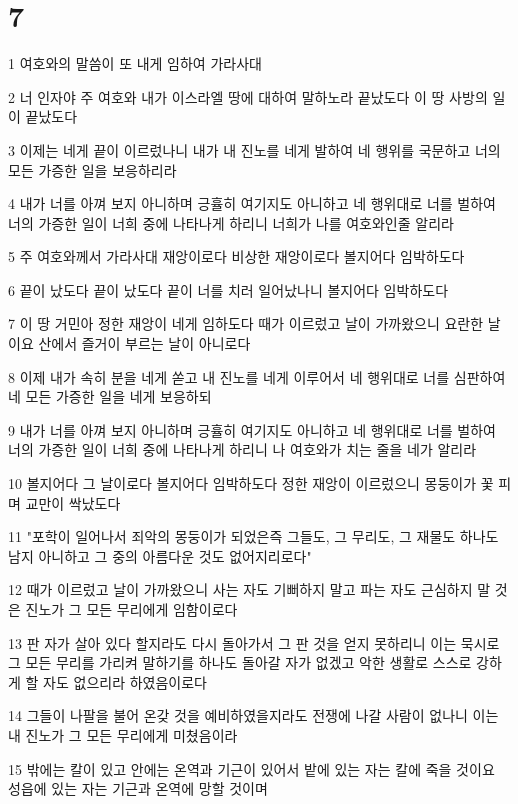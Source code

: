 \chapter{7}

\par 1 여호와의 말씀이 또 내게 임하여 가라사대
\par 2 너 인자야 주 여호와 내가 이스라엘 땅에 대하여 말하노라 끝났도다 이 땅 사방의 일이 끝났도다
\par 3 이제는 네게 끝이 이르렀나니 내가 내 진노를 네게 발하여 네 행위를 국문하고 너의 모든 가증한 일을 보응하리라
\par 4 내가 너를 아껴 보지 아니하며 긍휼히 여기지도 아니하고 네 행위대로 너를 벌하여 너의 가증한 일이 너희 중에 나타나게 하리니 너희가 나를 여호와인줄 알리라
\par 5 주 여호와께서 가라사대 재앙이로다 비상한 재앙이로다 볼지어다 임박하도다
\par 6 끝이 났도다 끝이 났도다 끝이 너를 치러 일어났나니 볼지어다 임박하도다
\par 7 이 땅 거민아 정한 재앙이 네게 임하도다 때가 이르렀고 날이 가까왔으니 요란한 날이요 산에서 즐거이 부르는 날이 아니로다
\par 8 이제 내가 속히 분을 네게 쏟고 내 진노를 네게 이루어서 네 행위대로 너를 심판하여 네 모든 가증한 일을 네게 보응하되
\par 9 내가 너를 아껴 보지 아니하며 긍휼히 여기지도 아니하고 네 행위대로 너를 벌하여 너의 가증한 일이 너희 중에 나타나게 하리니 나 여호와가 치는 줄을 네가 알리라
\par 10 볼지어다 그 날이로다 볼지어다 임박하도다 정한 재앙이 이르렀으니 몽둥이가 꽃 피며 교만이 싹났도다
\par 11 "포학이 일어나서 죄악의 몽둥이가 되었은즉 그들도, 그 무리도, 그 재물도 하나도 남지 아니하고 그 중의 아름다운 것도 없어지리로다"
\par 12 때가 이르렀고 날이 가까왔으니 사는 자도 기뻐하지 말고 파는 자도 근심하지 말 것은 진노가 그 모든 무리에게 임함이로다
\par 13 판 자가 살아 있다 할지라도 다시 돌아가서 그 판 것을 얻지 못하리니 이는 묵시로 그 모든 무리를 가리켜 말하기를 하나도 돌아갈 자가 없겠고 악한 생활로 스스로 강하게 할 자도 없으리라 하였음이로다
\par 14 그들이 나팔을 불어 온갖 것을 예비하였을지라도 전쟁에 나갈 사람이 없나니 이는 내 진노가 그 모든 무리에게 미쳤음이라
\par 15 밖에는 칼이 있고 안에는 온역과 기근이 있어서 밭에 있는 자는 칼에 죽을 것이요 성읍에 있는 자는 기근과 온역에 망할 것이며
